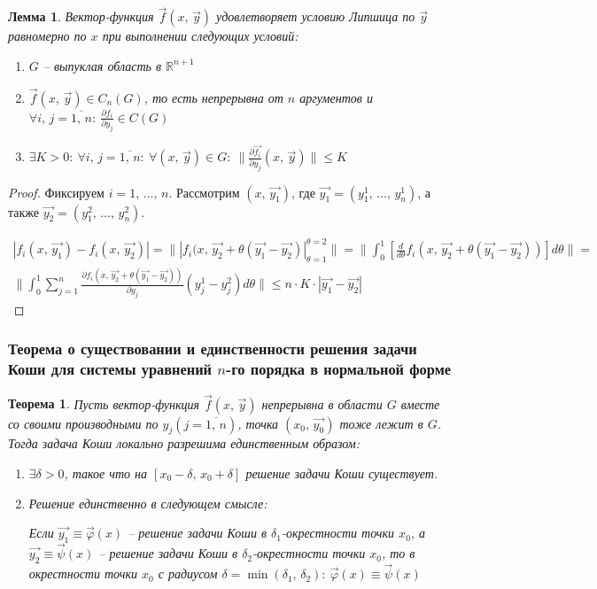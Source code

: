 \documentclass[a4paper,12pt]{article}
\renewcommand{\phi}{\ensuremath{\varphi}}
\renewcommand{\leq}{\ensuremath{\leqslant}}
\theoremstyle{plain}
\newtheorem{theorem}{Теорема}[section]
\newtheorem{lemma}{Лемма}[section]
\theoremstyle{definition}
\theoremstyle{remark}
\begin{document}
\begin{lemma}
	Вектор-функция $\vec{f}(x,\,\vec{y})$ удовлетворяет условию Липшица по $\vec{y}$ равномерно по $x$ при выполнении следующих условий:

	\begin{enumerate}
		\item $G$ -- выпуклая область в $\mathbb{R}^{n + 1}$
		\item $\vec{f}(x,\,\vec{y}) \in C_n(G)$, то есть непрерывна от $n$ аргументов и $\forall i,\, j = \overline{1,\,n}:\: \frac{\partial f_i}{\partial y_j} \in C(G)$
		\item $\exists K > 0:\: \forall i,\,j = \overline{1,\,n}:\: \forall (x,\, \vec{y}) \in G:\: \|\frac{\partial \vec{f_i}}{\partial y_j}(x,\,\vec{y})\| \leq K$
	\end{enumerate}
\end{lemma}

\begin{proof}
	Фиксируем $i = 1,\,\ldots,\,n$. Рассмотрим $(x,\, \vec{y_1})$, где $\vec{y_1} = (y_1^1,\,\ldots,\,y_n^1)$, а также $\vec{y_2} = (y_1^2,\,\ldots,\,y_n^2)$.

	\begin{align*}
		|f_i(x,\,\vec{y_1}) - f_i(x,\,\vec{y_2})| = \||f_i(x,\, \vec{y_2} + \theta(\vec{y_1} - \vec{y_2})|_{\theta = 1}^{\theta = 2}\| = \|\int_0^1 \left[\frac{d}{d\theta}f_i(x,\,\vec{y_2} + \theta(\vec{y_1} - \vec{y_2}))\right]d\theta\| = \\
		\|\int_0^1 \sum_{j = 1}^n \frac{\partial f_i(x,\, \vec{y_2} + \theta(\vec{y_1} - \vec{y_2}))}{\partial y_j}(y^1_j - y^2_j)d\theta\| \leq n \cdot K \cdot |\vec{y_1} - \vec{y_2}|
	\end{align*}
\end{proof}

\subsubsection*{Теорема о существовании и единственности решения задачи Коши для системы уравнений $n$-го порядка в нормальной форме}

\begin{theorem}
	Пусть вектор-функция $\vec{f}(x,\, \vec{y})$ непрерывна в области $G$ вместе со своими производными по $y_j (j = \overline{1,\,n})$, точка $(x_0,\, \vec{y_0})$ тоже лежит в $G$. Тогда задача Коши локально разрешима единственным образом:
	\begin{enumerate}
		\item $\exists \delta > 0$, такое что на $[x_0 - \delta,\, x_0 + \delta]$ решение задачи Коши существует.
		\item Решение единственно в следующем смысле:

		      Если $\vec{y_1} \equiv \vec{\phi}(x)$ -- решение задачи Коши в $\delta_1$-окрестности точки $x_0$, а $\vec{y_2} \equiv \vec{\psi}(x)$ -- решение задачи Коши в $\delta_2$-окрестности точки $x_0$, то в окрестности точки $x_0$ с радиусом $\delta = \min(\delta_1,\,\delta_2):\: \vec{\phi}(x) \equiv \vec{\psi}(x)$
	\end{enumerate}
\end{theorem}
\end{document}
